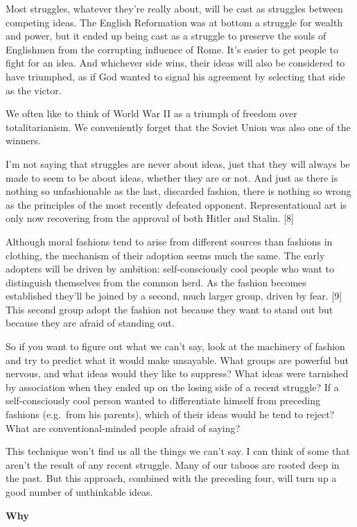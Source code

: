 Most struggles, whatever they're really about, will be cast as struggles
between competing ideas. The English Reformation was at bottom a
struggle for wealth and power, but it ended up being cast as a struggle
to preserve the souls of Englishmen from the corrupting influence of
Rome. It's easier to get people to fight for an idea. And whichever side
wins, their ideas will also be considered to have triumphed, as if God
wanted to signal his agreement by selecting that side as the victor.

We often like to think of World War II as a triumph of freedom over
totalitarianism. We conveniently forget that the Soviet Union was also
one of the winners.

I'm not saying that struggles are never about ideas, just that they will
always be made to seem to be about ideas, whether they are or not. And
just as there is nothing so unfashionable as the last, discarded
fashion, there is nothing so wrong as the principles of the most
recently defeated opponent. Representational art is only now recovering
from the approval of both Hitler and Stalin. {[}8{]}

Although moral fashions tend to arise from different sources than
fashions in clothing, the mechanism of their adoption seems much the
same. The early adopters will be driven by ambition: self-consciously
cool people who want to distinguish themselves from the common herd. As
the fashion becomes established they'll be joined by a second, much
larger group, driven by fear. {[}9{]} This second group adopt the
fashion not because they want to stand out but because they are afraid
of standing out.

So if you want to figure out what we can't say, look at the machinery of
fashion and try to predict what it would make unsayable. What groups are
powerful but nervous, and what ideas would they like to suppress? What
ideas were tarnished by association when they ended up on the losing
side of a recent struggle? If a self-consciously cool person wanted to
differentiate himself from preceding fashions (e.g.~from his parents),
which of their ideas would he tend to reject? What are
conventional-minded people afraid of saying?

This technique won't find us all the things we can't say. I can think of
some that aren't the result of any recent struggle. Many of our taboos
are rooted deep in the past. But this approach, combined with the
preceding four, will turn up a good number of unthinkable ideas.

\textbf{Why}

